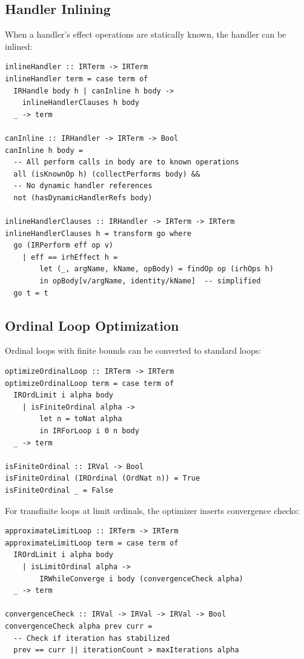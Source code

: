 \subsection{Handler Inlining}
\label{subsec:handler-inlining}

\begin{definition}
\label{def:handler-inlining}
When a handler's effect operations are statically known, the handler can be inlined:
\begin{verbatim}
inlineHandler :: IRTerm -> IRTerm
inlineHandler term = case term of
  IRHandle body h | canInline h body ->
    inlineHandlerClauses h body
  _ -> term

canInline :: IRHandler -> IRTerm -> Bool
canInline h body =
  -- All perform calls in body are to known operations
  all (isKnownOp h) (collectPerforms body) &&
  -- No dynamic handler references
  not (hasDynamicHandlerRefs body)

inlineHandlerClauses :: IRHandler -> IRTerm -> IRTerm
inlineHandlerClauses h = transform go where
  go (IRPerform eff op v)
    | eff == irhEffect h =
        let (_, argName, kName, opBody) = findOp op (irhOps h)
        in opBody[v/argName, identity/kName]  -- simplified
  go t = t
\end{verbatim}
\end{definition}

\subsection{Ordinal Loop Optimization}
\label{subsec:ordinal-opt}

\begin{definition}
\label{def:finite-ordinal-detect}
Ordinal loops with finite bounds can be converted to standard loops:
\begin{verbatim}
optimizeOrdinalLoop :: IRTerm -> IRTerm
optimizeOrdinalLoop term = case term of
  IROrdLimit i alpha body
    | isFiniteOrdinal alpha ->
        let n = toNat alpha
        in IRForLoop i 0 n body
  _ -> term

isFiniteOrdinal :: IRVal -> Bool
isFiniteOrdinal (IROrdinal (OrdNat n)) = True
isFiniteOrdinal _ = False
\end{verbatim}
\end{definition}

\begin{definition}
\label{def:limit-approx}
For transfinite loops at limit ordinals, the optimizer inserts convergence checks:
\begin{verbatim}
approximateLimitLoop :: IRTerm -> IRTerm
approximateLimitLoop term = case term of
  IROrdLimit i alpha body
    | isLimitOrdinal alpha ->
        IRWhileConverge i body (convergenceCheck alpha)
  _ -> term

convergenceCheck :: IRVal -> IRVal -> IRVal -> Bool
convergenceCheck alpha prev curr =
  -- Check if iteration has stabilized
  prev == curr || iterationCount > maxIterations alpha
\end{verbatim}
\end{definition}


